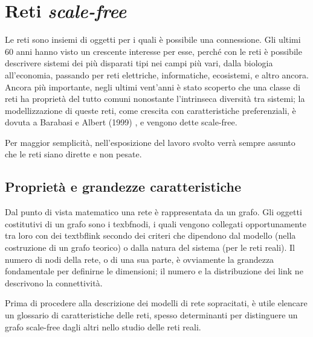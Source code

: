 
\section{Reti \emph{scale-free}}
\label{sec:teoria}
Le reti sono insiemi di oggetti per i quali è possibile una connessione. Gli ultimi 60 anni hanno visto un crescente interesse per esse, perché con le reti è possibile descrivere sistemi dei più disparati tipi nei campi più vari, dalla biologia all'economia, passando per reti elettriche, informatiche, ecosistemi,  e altro ancora. Ancora più importante, negli ultimi vent'anni è stato scoperto che una classe di reti ha proprietà del tutto comuni nonostante l'intrinseca diversità tra sistemi; la modellizzazione di queste reti, come crescita con caratteristiche preferenziali, è dovuta a Barabasi e Albert (1999)
, e vengono dette scale-free.

Per maggior semplicità, nell'esposizione del lavoro svolto verrà sempre assunto che le reti siano dirette e non pesate.

\subsection{Proprietà e grandezze caratteristiche}
Dal punto di vista matematico una rete è rappresentata da un grafo. Gli oggetti costitutivi di un grafo sono i texbf{nodi}, i quali vengono collegati opportunamente tra loro con dei textbf{link} secondo dei criteri che dipendono dal modello (nella costruzione di un grafo teorico) o dalla natura del sistema (per le reti reali). Il numero di nodi della rete, o di una sua parte, è ovviamente la grandezza fondamentale per definirne le dimensioni; il numero e la distribuzione dei link ne descrivono la connettività.

Prima di procedere alla descrizione dei modelli di rete sopracitati, è utile elencare un glossario di caratteristiche delle reti, spesso determinanti per distinguere un grafo scale-free dagli altri nello studio delle reti reali.

